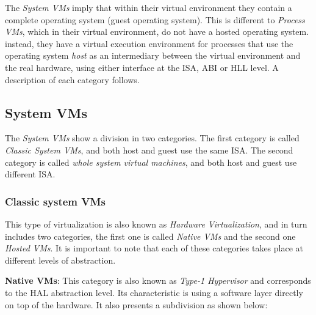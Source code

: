 	The \textit{System VMs} imply that within their virtual environment they contain a complete operating system (guest operating system). This is different to \textit{Process VMs}, which in their virtual environment, do not have a hosted operating system. instead, they have a virtual execution environment for processes that use the operating system \textit{host} as an intermediary between the virtual environment and the real hardware, using either interface at the ISA, ABI or HLL level. A description of each category follows.
	
	\subsection{System VMs}
	
	The \textit{System VMs} show a division in two categories.  The first category is called \textit{Classic System VMs}, and both host and guest use the same ISA. The second category is called \textit{whole system virtual machines}, and both host and guest use different ISA.
	
	\subsubsection{Classic system VMs} This type of virtualization is also known as \textit{Hardware Virtualization}, and in turn includes two categories, the first one is called \textit{Native VMs} and the second one \textit{Hosted VMs}. It is important to note that each of these categories takes place at different levels of abstraction.
	
	\textbf{Native VMs}: This category is also known as \textit{Type-1 Hypervisor} and corresponds to the HAL abstraction level. Its characteristic is using a software layer directly on top of the hardware. It also presents a subdivision as shown below:
		
